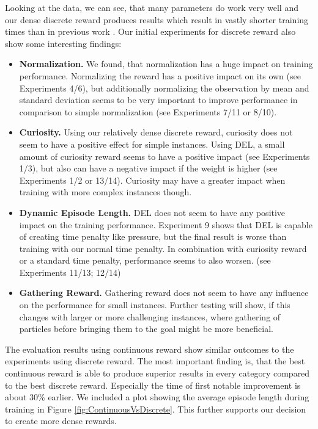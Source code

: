 Looking at the data, we can see, that many parameters do work very well and our dense discrete reward produces results which result in vastly shorter training times than in previous work \cite{huang2019}. Our initial experiments for discrete reward also show some interesting findings: 
\begin{itemize}
    \item \textbf{Normalization. } We found, that normalization has a huge impact on training performance. Normalizing the reward has a positive impact on its own (see Experiments 4/6), but additionally normalizing the observation by mean and standard deviation seems to be very important to improve performance in comparison to simple normalization (see Experiments 7/11 or 8/10).
    \item \textbf{Curiosity. } Using our relatively dense discrete reward, curiosity does not seem to have a positive effect for simple instances. Using DEL, a small amount of curiosity reward seems to have a positive impact (see Experiments 1/3), but also can have a negative impact if the weight is higher (see Experiments 1/2 or 13/14). Curiosity may have a greater impact when training with more complex instances though.
    \item \textbf{Dynamic Episode Length. } DEL does not seem to have any positive impact on the training performance. Experiment 9 shows that DEL is capable of creating time penalty like pressure, but the final result is worse than training with our normal time penalty. In combination with curiosity reward or a standard time penalty, performance seems to also worsen. (see Experiments 11/13; 12/14)
    \item \textbf{Gathering Reward. } Gathering reward does not seem to have any influence on the performance for small instances. Further testing will show, if this changes with larger or more challenging instances, where gathering of particles before bringing them to the goal might be more beneficial.
\end{itemize}



The evaluation results using continuous reward show similar outcomes to the experiments using discrete reward. The most important finding is, that the best continuous reward is able to produce superior results in every category compared to the best discrete reward. Especially the time of first notable improvement is about 30\% earlier. We included a plot showing the average episode length during training in Figure \ref{fig:ContinuousVsDiscrete}. This further supports our decision to create more dense rewards. 

